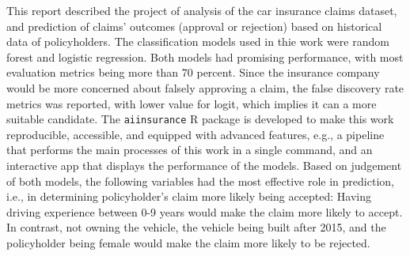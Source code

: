 \documentclass{article}
\begin{document}
This report described the project of analysis of the car insurance
claims dataset, and prediction of claims' outcomes (approval or
rejection) based on historical data of policyholders. The classification
models used in thie work were random forest and logistic regression.
Both models had promising performance, with most evaluation metrics
being more than 70 percent. Since the insurance company would be more
concerned about falsely approving a claim, the false discovery rate
metrics was reported, with lower value for logit, which implies it can a
more suitable candidate. The \texttt{aiinsurance} R package
\cite{package} is developed to make this work reproducible, accessible,
and equipped with advanced features, e.g., a pipeline that performs the
main processes of this work in a single command, and an interactive app
that displays the performance of the models. Based on judgement of both
models, the following variables had the most effective role in
prediction, i.e., in determining policyholder's claim more likely being
accepted: Having driving experience between 0-9 years would make the
claim more likely to accept. In contrast, not owning the vehicle, the
vehicle being built after 2015, and the policyholder being female would
make the claim more likely to be rejected.



\end{document}
